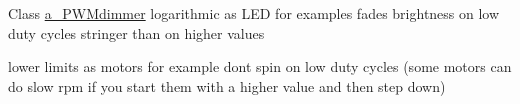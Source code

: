 
\begin{DoxyRefList}
\item[Class \mbox{\hyperlink{classa___p_w_mdimmer}{a\+\_\+\+PWMdimmer}} ]\label{todo__todo000001}%
%
logarithmic as LED for examples fades brightness on low duty cycles stringer than on higher values 

lower limits as motors for example don\textquotesingle{}t spin on low duty cycles (some motors can do slow rpm if you start them with a higher value and then step down) 
\end{DoxyRefList}